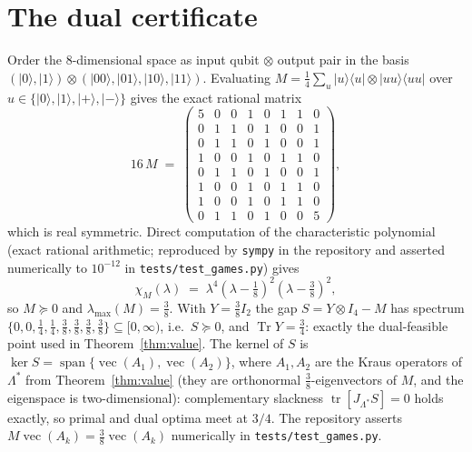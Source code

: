 \documentclass[11pt]{article}
\theoremstyle{definition}
\newcommand{\tr}{\operatorname{Tr}}
\begin{document}
\appendix

\section{The dual certificate}\label{app:cert}

Order the $8$-dimensional space as input qubit $\otimes$ output pair in the
basis $(|0\rangle,|1\rangle) \otimes (|00\rangle,|01\rangle,|10\rangle,|11\rangle)$.
Evaluating $M = \tfrac14 \sum_u |u\rangle\langle u| \otimes |uu\rangle\langle uu|$
over $u \in \{|0\rangle,|1\rangle,|+\rangle,|-\rangle\}$ gives the exact rational
matrix
\[
  16\,M \;=\;
  \begin{pmatrix}
  5&0&0&1&0&1&1&0\\
  0&1&1&0&1&0&0&1\\
  0&1&1&0&1&0&0&1\\
  1&0&0&1&0&1&1&0\\
  0&1&1&0&1&0&0&1\\
  1&0&0&1&0&1&1&0\\
  1&0&0&1&0&1&1&0\\
  0&1&1&0&1&0&0&5
  \end{pmatrix},
\]
which is real symmetric.  Direct computation of the characteristic polynomial
(exact rational arithmetic; reproduced by \texttt{sympy} in the repository and
asserted numerically to $10^{-12}$ in \texttt{tests/test\_games.py}) gives
\[
  \chi_M(\lambda) \;=\; \lambda^4 \left(\lambda - \tfrac18\right)^2
  \left(\lambda - \tfrac38\right)^2 ,
\]
so $M \succeq 0$ and $\lambda_{\max}(M) = \tfrac38$.  With $Y = \tfrac38 I_2$ the
gap $S = Y \otimes I_4 - M$ has spectrum
$\{0, 0, \tfrac14, \tfrac14, \tfrac38, \tfrac38, \tfrac38, \tfrac38\} \subseteq
[0,\infty)$, i.e.\ $S \succeq 0$, and $\tr Y = \tfrac34$: exactly the
dual-feasible point used in Theorem~\ref{thm:value}.  The kernel of $S$ is
$\ker S = \operatorname{span}\{\operatorname{vec}(A_1),
\operatorname{vec}(A_2)\}$, where $A_1, A_2$ are the Kraus operators of
$\Lambda^\ast$ from Theorem~\ref{thm:value} (they are orthonormal
$\tfrac38$-eigenvectors of $M$, and the eigenspace is two-dimensional):
complementary slackness $\operatorname{tr}[J_{\Lambda^\ast} S] = 0$ holds
exactly, so primal and dual optima meet at $3/4$.  The repository asserts
$M \operatorname{vec}(A_k) = \tfrac38 \operatorname{vec}(A_k)$ numerically in
\texttt{tests/test\_games.py}.
\end{document}
